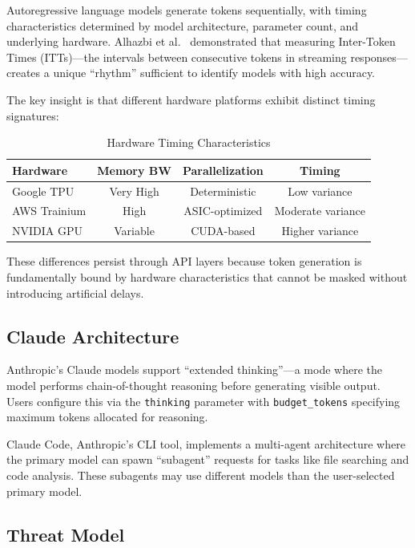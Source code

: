 \documentclass[11pt,a4paper]{article}
\begin{document}
Autoregressive language models generate tokens sequentially, with timing characteristics determined by model architecture, parameter count, and underlying hardware. Alhazbi et al.\ \cite{llms-rhythm} demonstrated that measuring Inter-Token Times (ITTs)---the intervals between consecutive tokens in streaming responses---creates a unique ``rhythm'' sufficient to identify models with high accuracy.

The key insight is that different hardware platforms exhibit distinct timing signatures:

\begin{table}[H]
\centering
\caption{Hardware Timing Characteristics}
\begin{tabular}{lccc}
\toprule
Hardware & Memory BW & Parallelization & Timing \\
\midrule
Google TPU & Very High & Deterministic & Low variance \\
AWS Trainium & High & ASIC-optimized & Moderate variance \\
NVIDIA GPU & Variable & CUDA-based & Higher variance \\
\bottomrule
\end{tabular}
\end{table}

These differences persist through API layers because token generation is fundamentally bound by hardware characteristics that cannot be masked without introducing artificial delays.

\subsection{Claude Architecture}

Anthropic's Claude models support ``extended thinking''---a mode where the model performs chain-of-thought reasoning before generating visible output. Users configure this via the \texttt{thinking} parameter with \texttt{budget\_tokens} specifying maximum tokens allocated for reasoning.

Claude Code, Anthropic's CLI tool, implements a multi-agent architecture where the primary model can spawn ``subagent'' requests for tasks like file searching and code analysis. These subagents may use different models than the user-selected primary model.

\subsection{Threat Model}
\end{document}
